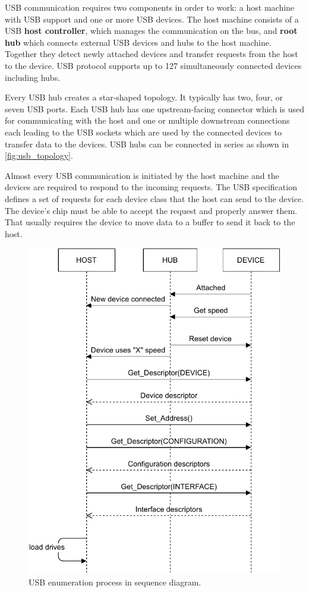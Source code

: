 USB communication requires two components in order to work: a host machine with USB support and one or more USB devices. The host machine consists of a USB \textbf{host controller}, which manages the communication on the bus, and \textbf{root hub} which connects external USB devices and hubs to the host machine. Together they detect newly attached devices and transfer requests from the host to the device. USB protocol supports up to 127 simultaneously connected devices including hubs.

Every USB hub creates a star-shaped topology. It typically has two, four, or seven USB ports. Each USB hub has one upstream-facing connector which is used for communicating with the host and one or multiple downstream connections each leading to the USB sockets which are used by the connected devices to transfer data to the devices. USB hubs can be connected in series as shown in \autoref{fig:usb_topology}.

Almost every USB communication is initiated by the host machine and the devices are required to respond to the incoming requests. The USB specification defines a set of requests for each device class that the host can send to the device. The device's chip must be able to accept the request and properly answer them. That usually requires the device to move data to a buffer to send it back to the host.

\begin{figure}[ht]
    \centering
    \includegraphics[width=0.65\linewidth]{obrazky-figures/enumeration_diagram.pdf}
    \caption{USB enumeration process in sequence diagram.}
    \label{fig:enumeration_diagram}
\end{figure}


